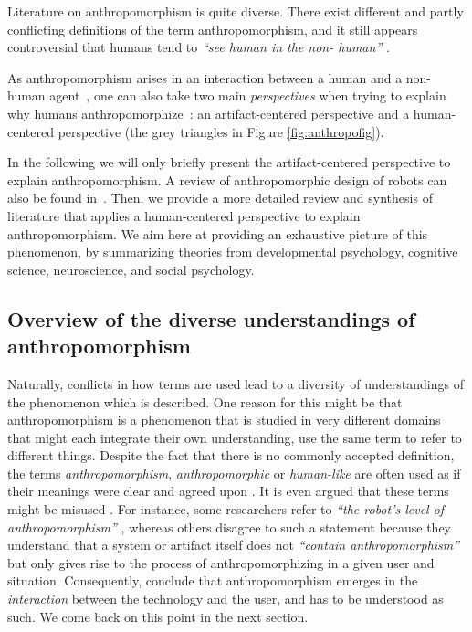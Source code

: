 \documentclass{frontiersSCNS} %
\begin{document}
Literature on anthropomorphism is quite diverse. There exist different and
partly conflicting definitions of the term anthropomorphism, and it still
appears controversial that humans tend to \textit{``see human
in the non- human''} \citep{epley_seeing_2007}.

As anthropomorphism arises in an interaction between a human and a non-human
agent~\citep{persson_anthropomorphism_2000}, one can also take two main
\textit{perspectives} when trying to explain why humans anthropomorphize~\citep{lee_human_2005}: an artifact-centered perspective and a human-centered
perspective (the grey triangles in Figure \ref{fig:anthropofig}).

In the following we will only briefly present the artifact-centered perspective
to explain anthropomorphism. A review of anthropomorphic design of robots can
also be found in~\cite{fink_anthropomorphism_2012}. Then, we provide a more
detailed review and synthesis of literature that applies a human-centered
perspective to explain anthropomorphism. We aim here at providing an exhaustive
picture of this phenomenon, by summarizing theories from developmental
psychology, cognitive science, neuroscience, and social psychology.

\subsection{Overview of the diverse understandings of anthropomorphism}

Naturally, conflicts in how terms are used lead to a diversity of understandings
of the phenomenon which is described.  One reason for this might be that
anthropomorphism is a phenomenon that is studied in very different domains that
might each integrate their own understanding, use the same term to refer to
different things.  Despite the fact that there is no commonly accepted
definition, the terms \textit{anthropomorphism}, \textit{anthropomorphic} or
\textit{human-like} are often used as if their meanings were clear and agreed
upon \citep{persson_anthropomorphism_2000}. It is even argued that these terms
might be misused \citep{duffy_anthropomorphism_2002,epley_when_2008}.  For
instance, some researchers refer to \textit{``the robot's level of
anthropomorphism''} \citep{bartneck_is_2007,feil-seifer_human-robot_2008},
whereas others disagree to such a statement because they understand that a
system or artifact itself does not \textit{``contain anthropomorphism''} but
only gives rise to the process of anthropomorphizing in a given user and
situation. Consequently, \cite{persson_anthropomorphism_2000} conclude that
anthropomorphism emerges in the \textit{interaction} between the technology and
the user, and has to be understood as such. We come back on this point in the
next section.
\end{document}
